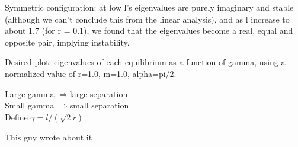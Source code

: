 \documentclass{rspublic}
\newcommand{\ra}{$\Longrightarrow$}  %
\begin{document}
Symmetric configuration:  at low l's eigenvalues are purely imaginary and
stable (although we can't conclude this from the linear analysis), and as l
increase to about 1.7 (for r = 0.1), we found that the eigenvalues become a
real, equal and opposite pair, implying instability.

Desired plot: eigenvalues of each equilibrium as a function of gamma, using a
normalized value of r=1.0, m=1.0, alpha=pi/2.

Large gamma \ra large separation \\
Small gamma \ra  small separation \\

Define $\gamma = l / (\sqrt{2}r)$

This guy wrote about it \cite{Stewart1966}



\end{document}
